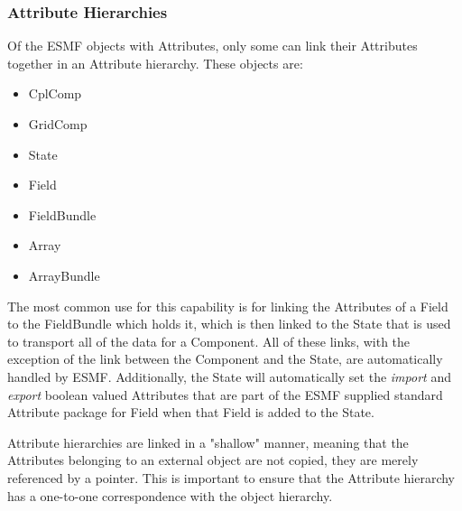 \subsubsection{Attribute Hierarchies}
\label{sec:AttHeir}

Of the ESMF objects with Attributes, only some can link their Attributes together in an Attribute hierarchy.  These objects are:

\begin{itemize}
\item CplComp
\item GridComp
\item State
\item Field
\item FieldBundle
\item Array
\item ArrayBundle
\end{itemize}

The most common use for this capability is for linking the Attributes of a Field to the FieldBundle which holds it, which is then linked to the State that is used to transport all of the data for a Component.  All of these links, with the exception of the link between the Component and the State, are automatically handled by ESMF. Additionally, the State will automatically set the {\it import} and {\it export} boolean valued Attributes that are part of the ESMF supplied standard Attribute package for Field when that Field is added to the State. 

Attribute hierarchies are linked in a "shallow" manner, meaning that the Attributes belonging to an external object are not copied, they are merely referenced by a pointer.  This is important to ensure that the Attribute hierarchy has a one-to-one correspondence with the object hierarchy.  
